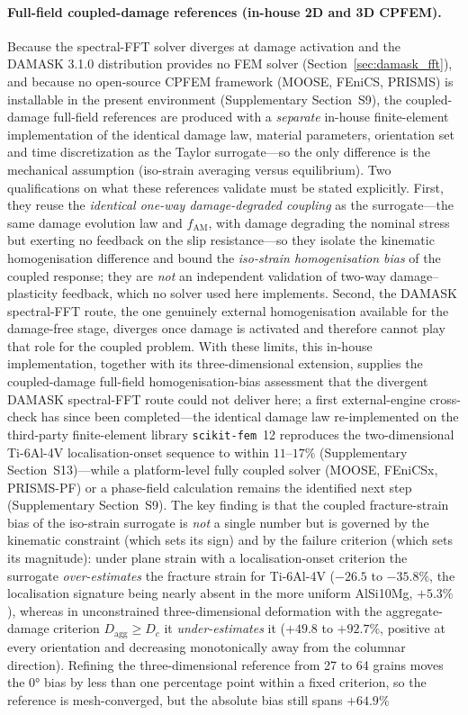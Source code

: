 \documentclass[12pt,a4paper,twocolumn]{article}
\begin{document}
\paragraph{Full-field coupled-damage references (in-house 2D and 3D CPFEM).}
Because the spectral-FFT solver diverges at damage activation and the DAMASK 3.1.0 distribution provides no FEM solver (Section~\ref{sec:damask_fft}), and because no open-source CPFEM framework (MOOSE, FEniCS, PRISMS) is installable in the present environment (Supplementary Section~S9), the coupled-damage full-field references are produced with a \emph{separate} in-house finite-element implementation of the identical damage law, material parameters, orientation set and time discretization as the Taylor surrogate---so the only difference is the mechanical assumption (iso-strain averaging versus equilibrium). Two qualifications on what these references validate must be stated explicitly. First, they reuse the \emph{identical one-way damage-degraded coupling} as the surrogate---the same damage evolution law and $f_{\mathrm{AM}}$, with damage degrading the nominal stress but exerting no feedback on the slip resistance---so they isolate the kinematic homogenisation difference and bound the \emph{iso-strain homogenisation bias} of the coupled response; they are \emph{not} an independent validation of two-way damage--plasticity feedback, which no solver used here implements. Second, the DAMASK spectral-FFT route, the one genuinely external homogenisation available for the damage-free stage, diverges once damage is activated and therefore cannot play that role for the coupled problem. With these limits, this in-house implementation, together with its three-dimensional extension, supplies the coupled-damage full-field homogenisation-bias assessment that the divergent DAMASK spectral-FFT route could not deliver here; a first external-engine cross-check has since been completed---the identical damage law re-implemented on the third-party finite-element library \texttt{scikit-fem}~12 reproduces the two-dimensional Ti-6Al-4V localisation-onset sequence to within $11$--$17\%$ (Supplementary Section~S13)---while a platform-level fully coupled solver (MOOSE, FEniCSx, PRISMS-PF) or a phase-field calculation remains the identified next step (Supplementary Section~S9). The key finding is that the coupled fracture-strain bias of the iso-strain surrogate is \emph{not} a single number but is governed by the kinematic constraint (which sets its sign) and by the failure criterion (which sets its magnitude): under plane strain with a localisation-onset criterion the surrogate \emph{over-estimates} the fracture strain for Ti-6Al-4V ($-26.5$ to $-35.8\%$, the localisation signature being nearly absent in the more uniform AlSi10Mg, $+5.3\%$), whereas in unconstrained three-dimensional deformation with the aggregate-damage criterion $D_{\mathrm{agg}}\ge D_c$ it \emph{under-estimates} it ($+49.8$ to $+92.7\%$, positive at every orientation and decreasing monotonically away from the columnar direction). Refining the three-dimensional reference from 27 to 64 grains moves the $\ang{0}$ bias by less than one percentage point within a fixed criterion, so the reference is mesh-converged, but the absolute bias still spans $+64.9\%$ 
\end{document}
